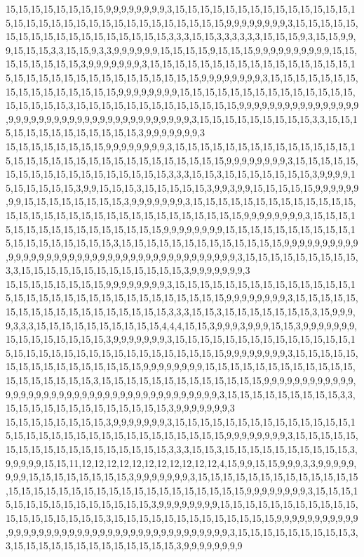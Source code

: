 15,15,15,15,15,15,15,15,9,9,9,9,9,9,9,9,3,15,15,15,15,15,15,15,15,15,15,15,15,15,15,15,15,15,15,15,15,15,15,15,15,15,15,15,15,15,15,15,15,9,9,9,9,9,9,9,9,3,15,15,15,15,15,15,15,15,15,15,15,15,15,15,15,15,15,15,3,3,3,15,15,3,3,3,3,3,3,15,15,15,9,3,15,15,9,9,9,15,15,15,3,3,15,15,9,3,3,9,9,9,9,9,9,15,15,15,15,9,15,15,15,9,9,9,9,9,9,9,9,9,9,15,15,15,15,15,15,15,15,3,9,9,9,9,9,9,9,3,15,15,15,15,15,15,15,15,15,15,15,15,15,15,15,15,15,15,15,15,15,15,15,15,15,15,15,15,15,15,15,15,9,9,9,9,9,9,9,9,3,15,15,15,15,15,15,15,15,15,15,15,15,15,15,15,15,9,9,9,9,9,9,9,9,15,15,15,15,15,15,15,15,15,15,15,15,15,15,15,15,15,15,15,3,15,15,15,15,15,15,15,15,15,15,15,15,15,9,9,9,9,9,9,9,9,9,9,9,9,9,9,9,9,9,9,9,9,9,9,9,9,9,9,9,9,9,9,9,9,9,9,9,9,9,9,9,9,3,15,15,15,15,15,15,15,15,15,3,3,15,15,15,15,15,15,15,15,15,15,15,15,15,3,9,9,9,9,9,9,9,3
15,15,15,15,15,15,15,15,9,9,9,9,9,9,9,9,3,15,15,15,15,15,15,15,15,15,15,15,15,15,15,15,15,15,15,15,15,15,15,15,15,15,15,15,15,15,15,15,15,9,9,9,9,9,9,9,9,3,15,15,15,15,15,15,15,15,15,15,15,15,15,15,15,15,15,15,3,3,3,15,15,3,15,15,15,15,15,15,15,3,9,9,9,9,15,15,15,15,15,15,3,9,9,15,15,15,3,15,15,15,15,15,3,9,9,3,9,9,15,15,15,15,15,9,9,9,9,9,9,9,9,15,15,15,15,15,15,15,15,3,9,9,9,9,9,9,9,3,15,15,15,15,15,15,15,15,15,15,15,15,15,15,15,15,15,15,15,15,15,15,15,15,15,15,15,15,15,15,15,15,9,9,9,9,9,9,9,9,3,15,15,15,15,15,15,15,15,15,15,15,15,15,15,15,15,9,9,9,9,9,9,9,9,15,15,15,15,15,15,15,15,15,15,15,15,15,15,15,15,15,15,15,3,15,15,15,15,15,15,15,15,15,15,15,15,15,9,9,9,9,9,9,9,9,9,9,9,9,9,9,9,9,9,9,9,9,9,9,9,9,9,9,9,9,9,9,9,9,9,9,9,9,9,9,9,9,3,15,15,15,15,15,15,15,15,15,3,3,15,15,15,15,15,15,15,15,15,15,15,15,15,3,9,9,9,9,9,9,9,3
15,15,15,15,15,15,15,15,9,9,9,9,9,9,9,9,3,15,15,15,15,15,15,15,15,15,15,15,15,15,15,15,15,15,15,15,15,15,15,15,15,15,15,15,15,15,15,15,15,9,9,9,9,9,9,9,9,3,15,15,15,15,15,15,15,15,15,15,15,15,15,15,15,15,15,15,3,3,3,15,15,3,15,15,15,15,15,15,15,3,15,9,9,9,9,3,3,3,15,15,15,15,15,15,15,15,15,15,4,4,4,15,15,3,9,9,9,3,9,9,9,15,15,3,9,9,9,9,9,9,9,15,15,15,15,15,15,15,15,3,9,9,9,9,9,9,9,3,15,15,15,15,15,15,15,15,15,15,15,15,15,15,15,15,15,15,15,15,15,15,15,15,15,15,15,15,15,15,15,15,9,9,9,9,9,9,9,9,3,15,15,15,15,15,15,15,15,15,15,15,15,15,15,15,15,9,9,9,9,9,9,9,9,15,15,15,15,15,15,15,15,15,15,15,15,15,15,15,15,15,15,15,3,15,15,15,15,15,15,15,15,15,15,15,15,15,9,9,9,9,9,9,9,9,9,9,9,9,9,9,9,9,9,9,9,9,9,9,9,9,9,9,9,9,9,9,9,9,9,9,9,9,9,9,9,9,3,15,15,15,15,15,15,15,15,15,3,3,15,15,15,15,15,15,15,15,15,15,15,15,15,3,9,9,9,9,9,9,9,3
15,15,15,15,15,15,15,15,3,9,9,9,9,9,9,9,3,15,15,15,15,15,15,15,15,15,15,15,15,15,15,15,15,15,15,15,15,15,15,15,15,15,15,15,15,15,15,15,15,9,9,9,9,9,9,9,9,3,15,15,15,15,15,15,15,15,15,15,15,15,15,15,15,15,15,15,3,3,3,15,15,3,15,15,15,15,15,15,15,15,15,15,3,9,9,9,9,9,15,15,11,12,12,12,12,12,12,12,12,12,12,12,4,15,9,9,15,15,9,9,9,3,3,9,9,9,9,9,9,9,9,15,15,15,15,15,15,15,15,3,9,9,9,9,9,9,9,3,15,15,15,15,15,15,15,15,15,15,15,15,15,15,15,15,15,15,15,15,15,15,15,15,15,15,15,15,15,15,15,15,9,9,9,9,9,9,9,9,3,15,15,15,15,15,15,15,15,15,15,15,15,15,15,15,3,9,9,9,9,9,9,9,9,15,15,15,15,15,15,15,15,15,15,15,15,15,15,15,15,15,15,15,3,15,15,15,15,15,15,15,15,15,15,15,15,15,9,9,9,9,9,9,9,9,9,9,9,9,9,9,9,9,9,9,9,9,9,9,9,9,9,9,9,9,9,9,9,9,9,9,9,9,9,9,9,9,3,15,15,15,15,15,15,15,15,15,3,3,15,15,15,15,15,15,15,15,15,15,15,15,15,3,9,9,9,9,9,9,9,9
